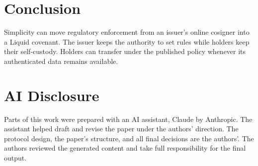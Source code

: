 \documentclass[11pt]{article}
\begin{document}
    \section{Conclusion}

    Simplicity can move regulatory enforcement from an issuer's online cosigner into a Liquid covenant.
    The issuer keeps the authority to set rules while holders keep their self-custody.
    Holders can transfer under the published policy whenever its authenticated data remains available.


    \section*{AI Disclosure}

    Parts of this work were prepared with an AI assistant, Claude by Anthropic.
    The assistant helped draft and revise the paper under the authors' direction.
    The protocol design, the paper's structure, and all final decisions are the authors'.
    The authors reviewed the generated content and take full responsibility for the final output.

        {\small\sloppy
    
    
    }
\end{document}
